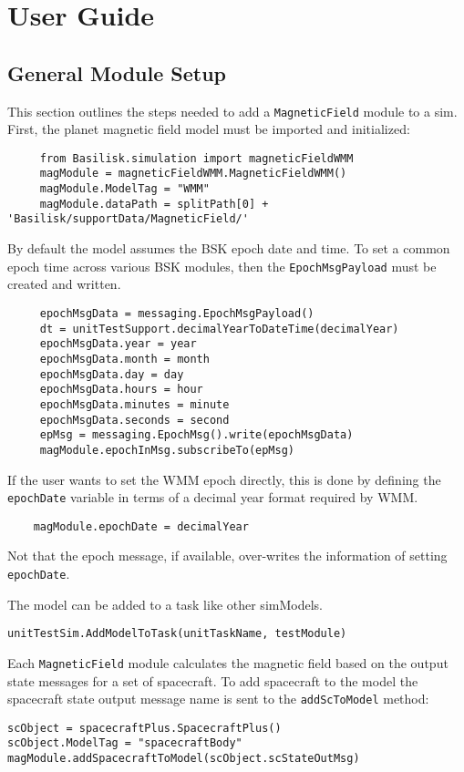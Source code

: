 
\section{User Guide}

\subsection{General Module Setup}
This section outlines the steps needed to add a {\tt MagneticField} module to a sim.
First, the planet magnetic field model must be imported and initialized:
\begin{verbatim}
     from Basilisk.simulation import magneticFieldWMM
     magModule = magneticFieldWMM.MagneticFieldWMM()
     magModule.ModelTag = "WMM"
     magModule.dataPath = splitPath[0] + 'Basilisk/supportData/MagneticField/'
\end{verbatim}
By default the model assumes the BSK epoch date and time.  To set a common epoch time across various BSK modules, then the {\tt EpochMsgPayload} must be created and written.
\begin{verbatim}
     epochMsgData = messaging.EpochMsgPayload()
     dt = unitTestSupport.decimalYearToDateTime(decimalYear)
     epochMsgData.year = year
     epochMsgData.month = month
     epochMsgData.day = day
     epochMsgData.hours = hour
     epochMsgData.minutes = minute
     epochMsgData.seconds = second
     epMsg = messaging.EpochMsg().write(epochMsgData)
     magModule.epochInMsg.subscribeTo(epMsg)
\end{verbatim}
If the user wants to set the WMM epoch directly, this is done by defining the {\tt epochDate} variable in terms of a decimal year format required by WMM. 
\begin{verbatim}
	magModule.epochDate = decimalYear
\end{verbatim}
Not that the epoch message, if available, over-writes the information of setting {\tt epochDate}.  

The model can  be added to a task like other simModels. 
\begin{verbatim}
unitTestSim.AddModelToTask(unitTaskName, testModule)
\end{verbatim}

Each {\tt MagneticField} module calculates the magnetic field based on the output state messages for a set of spacecraft.
To add spacecraft to the model the spacecraft state output message name is sent to the \verb|addScToModel| method:
\begin{verbatim}
scObject = spacecraftPlus.SpacecraftPlus()
scObject.ModelTag = "spacecraftBody"
magModule.addSpacecraftToModel(scObject.scStateOutMsg)
\end{verbatim}

